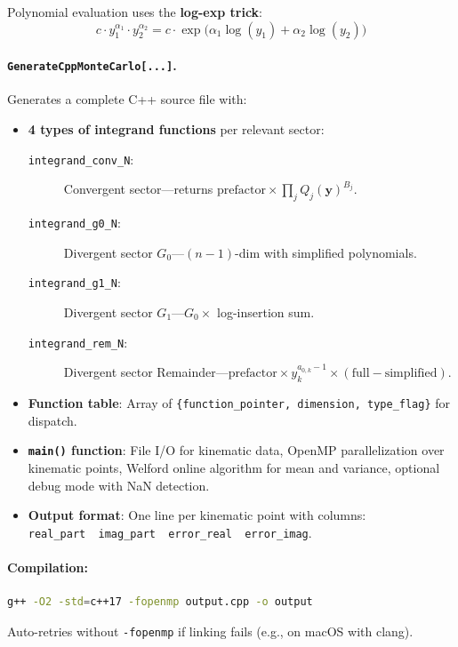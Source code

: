 \documentclass[11pt,a4paper]{article}
\begin{document}
Polynomial evaluation uses the \textbf{log-exp trick}:
\begin{equation}
c \cdot y_1^{\alpha_1} \cdot y_2^{\alpha_2} = c \cdot \exp\bigl(\alpha_1 \log(y_1) + \alpha_2 \log(y_2)\bigr)
\end{equation}

\paragraph{\texttt{GenerateCppMonteCarlo[...]}.} Generates a complete C++ source file with:

\begin{itemize}
  \item \textbf{4 types of integrand functions} per relevant sector:
    \begin{description}
      \item[\texttt{integrand\_conv\_N}:] Convergent sector---returns $\mathrm{prefactor} \times \prod_j Q_j(\mathbf{y})^{B_j}$.
      \item[\texttt{integrand\_g0\_N}:] Divergent sector $G_0$---$(n{-}1)$-dim with simplified polynomials.
      \item[\texttt{integrand\_g1\_N}:] Divergent sector $G_1$---$G_0 \times$ log-insertion sum.
      \item[\texttt{integrand\_rem\_N}:] Divergent sector Remainder---$\mathrm{prefactor} \times y_k^{a_{0,k}-1} \times (\text{full} - \text{simplified})$.
    \end{description}
  \item \textbf{Function table}: Array of \texttt{\{function\_pointer, dimension, type\_flag\}} for dispatch.
  \item \textbf{\texttt{main()} function}: File I/O for kinematic data, OpenMP parallelization over kinematic points, Welford online algorithm for mean and variance, optional debug mode with NaN detection.
  \item \textbf{Output format}: One line per kinematic point with columns: \texttt{real\_part~~imag\_part~~error\_real~~error\_imag}.
\end{itemize}

\paragraph{Compilation:}
\begin{lstlisting}[language=bash]
g++ -O2 -std=c++17 -fopenmp output.cpp -o output
\end{lstlisting}
Auto-retries without \texttt{-fopenmp} if linking fails (e.g., on macOS with clang).
\end{document}
